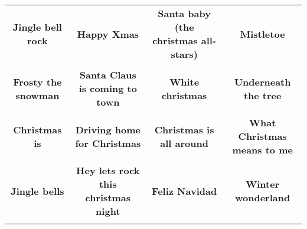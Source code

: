 \documentclass[12pt]{article} \usepackage{eso-pic, graphicx}
\newcommand{\background}[1]{%
\AddToShipoutPictureBG*{\texttt{[image: \#1]}}
}
\begin{document}
\tabcolsep=30.2pt \renewcommand{\arraystretch}{4.5}   \vspace*{4.3cm} \begin{center}  \begin{tabular}{c c c c}
\parbox{3cm}{\centering \textbf{Jingle bell rock}}& 
\parbox{3cm}{\centering \textbf{Happy Xmas}}& 
\parbox{3cm}{\centering \textbf{Santa baby (the christmas all-stars)}}& 
\parbox{3cm}{\centering \textbf{Mistletoe}}\\ \\ 
\parbox{3cm}{\centering \textbf{Frosty the snowman}}& 
\parbox{3cm}{\centering \textbf{Santa Claus is coming to town}}& 
\parbox{3cm}{\centering \textbf{White christmas}}& 
\parbox{3cm}{\centering \textbf{Underneath the tree}}\\ \\ 
\parbox{3cm}{\centering \textbf{Christmas is}}& 
\parbox{3cm}{\centering \textbf{Driving home for Christmas}}& 
\parbox{3cm}{\centering \textbf{Christmas is all around}}& 
\parbox{3cm}{\centering \textbf{What Christmas means to me}}\\ \\ 
\parbox{3cm}{\centering \textbf{Jingle bells}}& 
\parbox{3cm}{\centering \textbf{Hey lets rock this christmas night}}& 
\parbox{3cm}{\centering \textbf{Feliz Navidad}}& 
\parbox{3cm}{\centering \textbf{Winter wonderland}}\\ \\ 
\end{tabular} \background{discobingo.pdf} \end{center} 
\end{document}
